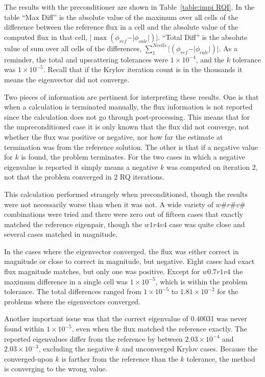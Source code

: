 %
The results with the preconditioner are shown in Table~\ref{table:impi RQI}. In the table ``Max Diff'' is the absolute value of the maximum over all cells of the difference between the reference flux in a cell and the absolute value of the computed flux in that cell, $\vert\max(\phi_{ref} - \vert\phi_{calc}\vert)\vert$. ``Total Diff'' is the absolute value of sum over all cells of the differences, $\sum_{1}^{Ncells}\vert(\phi_{ref} - \vert\phi_{calc}\vert)\vert$. As a reminder, the total and upscattering tolerances were $1 \times 10^{-4}$, and the $k$ tolerance was $1 \times 10^{-5}$. Recall that if the Krylov iteration count is in the thousands it means the eigenvector did not converge.

Two pieces of information are pertinent for interpreting these results. One is that when a calculation is terminated manually, the flux information is not reported since the calculation does not go through post-processing. This means that for the unpreconditioned case it is only known that the flux did not converge, not whether the flux was positive or negative, nor how far the estimate at termination was from the reference solution. The other is that if a negative value for $k$ is found, the problem terminates. For the two cases in which a negative eigenvalue is reported it simply means a negative $k$ was computed on iteration 2, not that the problem converged in 2 RQ iterations. 

This calculation performed strangely when preconditioned, though the results were not necessarily worse than when it was not. A wide variety of $w\#r\#v\#$ combinations were tried and there were zero out of fifteen cases that exactly matched the reference eigenpair, though the $w1r4v4$ case was quite close and several cases matched in magnitude. 

In the cases where the eigenvector converged, the flux was either correct in magnitude or close to correct in magnitude, but negative. Eight cases had exact flux magnitude matches, but only one was positive. Except for $w0.7r1v4$ the maximum difference in a single cell was $1 \times 10^{-5}$, which is within the problem tolerance. The total differences ranged from $1 \times 10^{-5}$ to $1.81 \times 10^{-2}$ for the problems where the eigenvectors converged. 

Another important issue was that the correct eigenvalue of 0.40031 was never found within $1 \times 10^{-5}$, even when the flux matched the reference exactly. The reported eigenvalues differ from the reference by between $2.03 \times 10^{-4}$ and $2.03 \times 10^{-3}$, excluding the negative $k$ and unconverged Krylov cases. Because the converged-upon $k$ is farther from the reference than the $k$ tolerance, the method is converging to the wrong value. 

